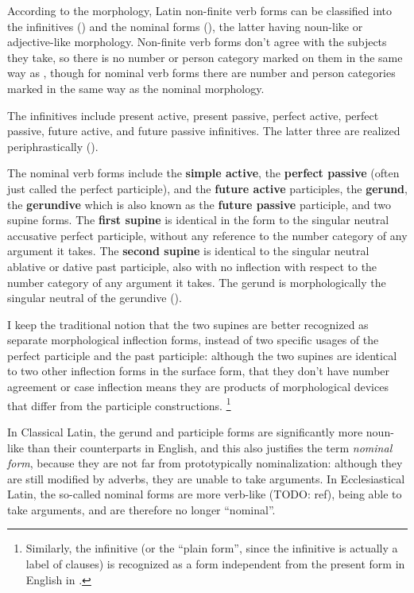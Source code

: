 \documentclass[a4paper, oneside, 12pt]{report}
\newcommand*{\citepage}[1]{p.~{#1}}
\newcommand*{\concept}[1]{\textbf{#1}}
\newcommand*{\term}[1]{\emph{#1}}
\begin{document}
According to the morphology,
Latin non-finite verb forms can be classified into the infinitives ()
and the nominal forms (),
the latter having noun-like or adjective-like morphology.
Non-finite verb forms don't agree with the subjects they take,
so there is no number or person category marked on them in the same way as ,
though for nominal verb forms there are number and person categories 
marked in the same way as the nominal morphology.

The infinitives include present active, present passive, perfect active, 
perfect passive, future active, and future passive infinitives.
The latter three are realized periphrastically ().

The nominal verb forms include 
the \concept{simple active}, 
the \concept{perfect passive} (often just called the perfect participle), 
and the \concept{future active} participles,
the \concept{gerund}, 
the \concept{gerundive} which is also known as the \concept{future passive} participle, 
and two supine forms.
The \concept{first supine} is identical in the form to the singular neutral accusative perfect participle,
without any reference to the number category of any argument it takes.
The \concept{second supine} is identical to the singular neutral ablative or dative past participle,
also with no inflection with respect to the number category of any argument it takes.
The gerund is morphologically the singular neutral of the gerundive
().

I keep the traditional notion that 
the two supines are better recognized as separate morphological inflection forms,
instead of two specific usages of the perfect participle and the past participle:
although the two supines are identical to two other inflection forms in the surface form,
that they don't have number agreement or case inflection 
means they are products of morphological devices that differ from the participle constructions.%
\footnote{
    Similarly, the infinitive 
    (or the ``plain form'', since the infinitive is actually a label of clauses)
    is recognized as a form 
    independent from the present form in English in \citet[\citepage{74}]{cgel}.
}

In Classical Latin, the gerund and participle forms are significantly more noun-like 
than their counterparts in English,
and this also justifies the term \term{nominal form},
because they are not far from prototypically nominalization:
although they are still modified by adverbs,
they are unable to take arguments.
In Ecclesiastical Latin, 
the so-called nominal forms are more verb-like (TODO: ref),
being able to take arguments,
and are therefore no longer ``nominal''.
\end{document}
